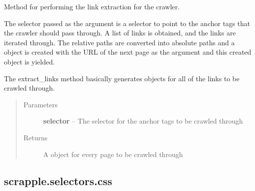 \documentclass[letterpaper,12pt,english]{sphinxmanual}
\begin{document}
\begin{fulllineitems}
\begin{fulllineitems}
\end{fulllineitems}


\begin{fulllineitems}
\label{implementation/selectors:scrapple.selectors.xpath.XpathSelector.extract_links}
Method for performing the link extraction for the crawler.

The selector passed as the argument is a selector to point to the anchor tags           that the crawler should pass through. A list of links is obtained, and the links                are iterated through. The relative paths are converted into absolute paths and          a  object is created with the URL of the next page as the argument               and this created object is yielded.

The extract\_links method basically generates  objects for all of                 the links to be crawled through.
\begin{quote}\begin{description}
\item[{Parameters}] \leavevmode
\textbf{selector} -- The selector for the anchor tags to be crawled through

\item[{Returns}] \leavevmode
A  object for every page to be crawled through

\end{description}\end{quote}

\end{fulllineitems}


\end{fulllineitems}

\label{implementation/selectors:module-scrapple.selectors.css}

\subsection{scrapple.selectors.css}
\label{implementation/selectors:scrapple-selectors-css}
\end{document}
